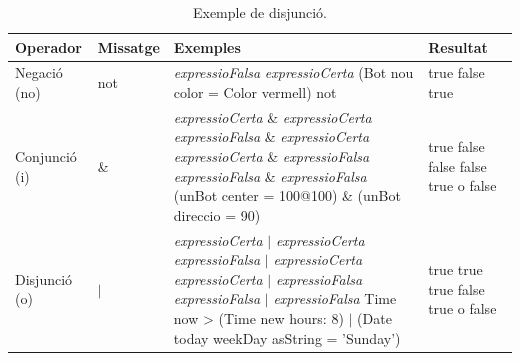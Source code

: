 \begin{table}[h]
\caption{Exemple de disjunció.}
\label{tab2005}
\setlength{\extrarowheight}{1mm}
{\small \begin{tabular}{p{20mm}p{15mm}p{70mm}p{20mm}}
\hline
\textbf{Operador} & \textbf{Missatge} & \textbf{Exemples} & \textbf{Resultat} \\
\hline
Negació (\textsf{no}) & \textsf{not} &
\textsf{{\itshape expressioFalsa}} \newline
\textsf{{\itshape expressioCerta}} \newline
\textsf{(Bot nou color = Color vermell) not} &
\textsf{true} \newline
\textsf{false} \newline
\textsf{true} \\
Conjunció (\textsf{i}) & \textsf{\&} &
\textsf{{\itshape expressioCerta} \& {\itshape expressioCerta}} \newline
\textsf{{\itshape expressioFalsa} \& {\itshape expressioCerta}} \newline
\textsf{{\itshape expressioCerta} \& {\itshape expressioFalsa}} \newline
\textsf{{\itshape expressioFalsa} \& {\itshape expressioFalsa}} \newline
\textsf{(unBot center = 100@100) \& \newline (unBot direccio = 90)} &
\textsf{true} \newline
\textsf{false} \newline
\textsf{false} \newline
\textsf{false} \newline
\textsf{true} o \textsf{false}\\
Disjunció (\textsf{o}) & \textsf{$|$} &
\textsf{{\itshape expressioCerta} $|$ {\itshape expressioCerta}} \newline
\textsf{{\itshape expressioFalsa} $|$ {\itshape expressioCerta}} \newline
\textsf{{\itshape expressioCerta} $|$ {\itshape expressioFalsa}} \newline
\textsf{{\itshape expressioFalsa} $|$ {\itshape expressioFalsa}} \newline
\textsf{Time now \textgreater \hspace*{1mm} (Time new hours: 8) $|$ \newline (Date today weekDay asString = 'Sunday')} &
\textsf{true} \newline
\textsf{true} \newline
\textsf{true} \newline
\textsf{false} \newline
\textsf{true} o \textsf{false}\\
\hline
\end{tabular}}
\end{table}

